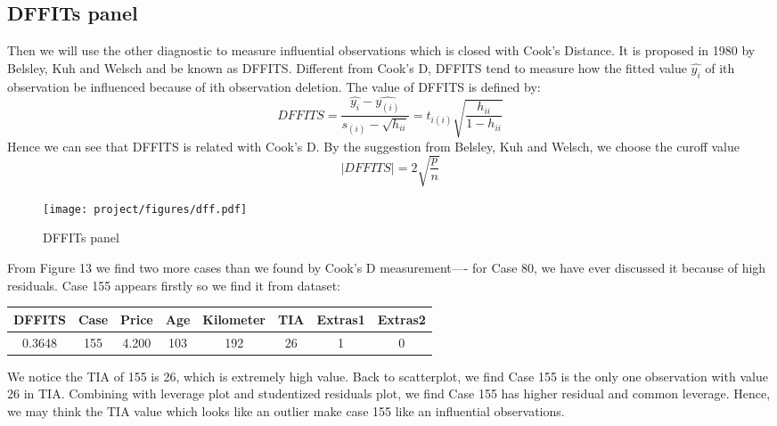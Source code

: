 \documentclass[a4paper]{article}
\begin{document}
\subsection{DFFITs panel}
Then we will use the other diagnostic to measure influential observations which is closed with Cook's Distance. It is proposed in 1980 by Belsley, Kuh and Welsch and be known as DFFITS. Different from Cook's D, DFFITS tend to measure how the fitted value $\hat{y_i}$ of ith observation be influenced because of ith observation deletion. The value of DFFITS is defined by: \[DFFITS = \frac{\hat{y_i}-\hat{y_{(i)}}}{s_{(i)}-\sqrt{h_{ii}}} = t_{i(i)}\sqrt{\frac{h_{ii}}{1-h_{ii}}}\]
Hence we can see that DFFITS is related with Cook's D. By the suggestion from Belsley, Kuh and Welsch, we choose the curoff value \[ | DFFITS | = 2 \sqrt{\frac{p}{n}}\] 

\begin{figure}[!htb]
    \centering
    \texttt{[image: project/figures/dff.pdf]}
    \caption{DFFITs panel}
    \label{fig:my_label}
\end{figure}

\noindent
From Figure 13 we find two more cases than we found by Cook's D measurement---- for Case 80, we have ever discussed it because of high residuals. Case 155 appears firstly so we find it from dataset:
\begin{table}[!htb]
\centering
\begin{tabular}{cccccccc}
\toprule
DFFITS & Case & Price & Age & Kilometer & TIA & Extras1 & Extras2 \\
\midrule
0.3648 & 155  & 4.200 & 103 & 192       & 26  & 1       & 0       \\
\bottomrule
\end{tabular}
\end{table}

\noindent
We notice the TIA of 155 is 26, which is extremely high value. Back to scatterplot, we find Case 155 is the only one observation with value 26 in TIA. Combining with leverage plot and studentized residuals plot, we find Case 155 has higher residual and common leverage. Hence, we may think the TIA value which looks like an outlier make case 155 like an influential observations.
\end{document}
